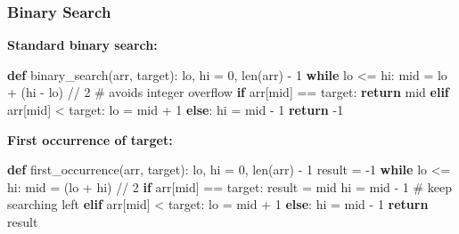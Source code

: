 \documentclass[11pt]{article}
\newenvironment{Shaded}{\begin{snugshade}}{\end{snugshade}}
\newcommand{\BuiltInTok}[1]{\textcolor[rgb]{0.50,0.55,0.55}{#1}}
\newcommand{\CommentTok}[1]{\textcolor[rgb]{0.48,0.49,0.49}{#1}}
\newcommand{\ControlFlowTok}[1]{\textcolor[rgb]{0.99,0.74,0.29}{\textbf{#1}}}
\newcommand{\DecValTok}[1]{\textcolor[rgb]{0.96,0.45,0.00}{#1}}
\newcommand{\KeywordTok}[1]{\textcolor[rgb]{0.81,0.81,0.76}{\textbf{#1}}}
\newcommand{\NormalTok}[1]{\textcolor[rgb]{0.81,0.81,0.76}{#1}}
\newcommand{\OperatorTok}[1]{\textcolor[rgb]{0.81,0.81,0.76}{#1}}
\begin{document}
\subsubsection{Binary Search}\label{binary-search}

\textbf{Standard binary search:}


\begin{Shaded}
\begin{Highlighting}[]
\KeywordTok{def}\NormalTok{ binary\_search(arr, target):}
\NormalTok{    lo, hi }\OperatorTok{=} \DecValTok{0}\NormalTok{, }\BuiltInTok{len}\NormalTok{(arr) }\OperatorTok{{-}} \DecValTok{1}
    \ControlFlowTok{while}\NormalTok{ lo }\OperatorTok{\textless{}=}\NormalTok{ hi:}
\NormalTok{        mid }\OperatorTok{=}\NormalTok{ lo }\OperatorTok{+}\NormalTok{ (hi }\OperatorTok{{-}}\NormalTok{ lo) }\OperatorTok{//} \DecValTok{2}   \CommentTok{\# avoids integer overflow}
        \ControlFlowTok{if}\NormalTok{ arr[mid] }\OperatorTok{==}\NormalTok{ target:}
            \ControlFlowTok{return}\NormalTok{ mid}
        \ControlFlowTok{elif}\NormalTok{ arr[mid] }\OperatorTok{\textless{}}\NormalTok{ target:}
\NormalTok{            lo }\OperatorTok{=}\NormalTok{ mid }\OperatorTok{+} \DecValTok{1}
        \ControlFlowTok{else}\NormalTok{:}
\NormalTok{            hi }\OperatorTok{=}\NormalTok{ mid }\OperatorTok{{-}} \DecValTok{1}
    \ControlFlowTok{return} \OperatorTok{{-}}\DecValTok{1}
\end{Highlighting}
\end{Shaded}

\textbf{First occurrence of target:}


\begin{Shaded}
\begin{Highlighting}[]
\KeywordTok{def}\NormalTok{ first\_occurrence(arr, target):}
\NormalTok{    lo, hi }\OperatorTok{=} \DecValTok{0}\NormalTok{, }\BuiltInTok{len}\NormalTok{(arr) }\OperatorTok{{-}} \DecValTok{1}
\NormalTok{    result }\OperatorTok{=} \OperatorTok{{-}}\DecValTok{1}
    \ControlFlowTok{while}\NormalTok{ lo }\OperatorTok{\textless{}=}\NormalTok{ hi:}
\NormalTok{        mid }\OperatorTok{=}\NormalTok{ (lo }\OperatorTok{+}\NormalTok{ hi) }\OperatorTok{//} \DecValTok{2}
        \ControlFlowTok{if}\NormalTok{ arr[mid] }\OperatorTok{==}\NormalTok{ target:}
\NormalTok{            result }\OperatorTok{=}\NormalTok{ mid}
\NormalTok{            hi }\OperatorTok{=}\NormalTok{ mid }\OperatorTok{{-}} \DecValTok{1}    \CommentTok{\# keep searching left}
        \ControlFlowTok{elif}\NormalTok{ arr[mid] }\OperatorTok{\textless{}}\NormalTok{ target:}
\NormalTok{            lo }\OperatorTok{=}\NormalTok{ mid }\OperatorTok{+} \DecValTok{1}
        \ControlFlowTok{else}\NormalTok{:}
\NormalTok{            hi }\OperatorTok{=}\NormalTok{ mid }\OperatorTok{{-}} \DecValTok{1}
    \ControlFlowTok{return}\NormalTok{ result}
\end{Highlighting}
\end{Shaded}
\end{document}
